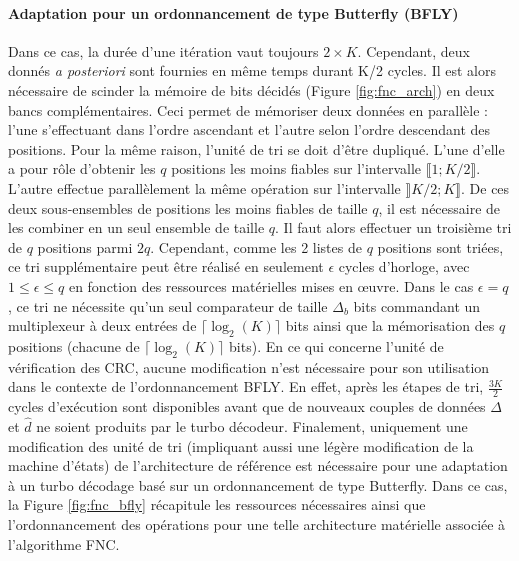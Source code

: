 \paragraph*{Adaptation pour un ordonnancement de type Butterfly (BFLY)}
Dans ce cas, la durée d'une itération vaut toujours $2\times K$. Cependant, deux donnés \textit{a posteriori} sont 
fournies en même temps durant K/2 cycles. Il est alors nécessaire de scinder la mémoire de bits décidés (Figure 
\ref{fig:fnc_arch}) en deux bancs complémentaires.
Ceci permet de mémoriser deux données en parallèle : l'une s'effectuant dans l'ordre ascendant 
et l'autre selon l'ordre descendant des positions. Pour la même raison, l'unité de tri se doit d'être dupliqué. L'une
d'elle a pour rôle d'obtenir les $q$ positions les moins fiables sur l'intervalle $\llbracket 1; K/2 \rrbracket$. L'autre
effectue parallèlement la même opération sur l'intervalle $\rrbracket K/2; K \rrbracket$. De ces deux sous-ensembles de positions
les moins fiables de taille $q$, il est nécessaire de les combiner en un seul ensemble de taille $q$. Il faut alors 
effectuer un troisième tri de $q$ positions parmi $2q$. Cependant, comme les 2 listes de $q$ positions sont triées, ce 
tri supplémentaire peut être réalisé en seulement $\epsilon$ cycles d'horloge, avec $1\leq \epsilon \leq q$ en fonction
des ressources matérielles mises en œuvre. Dans le cas $\epsilon = q$, ce tri ne nécessite qu'un seul comparateur 
de taille $\Delta_b$ bits commandant un multiplexeur à deux entrées de $\lceil\log_2(K)\rceil$ bits ainsi que la 
mémorisation des $q$ positions (chacune de $\lceil\log_2(K)\rceil$ bits). En ce qui concerne l'unité de vérification des CRC, aucune modification n'est nécessaire pour
son utilisation dans le contexte de l'ordonnancement BFLY. En effet, après les étapes de tri, $\frac{3K}{2}$ cycles 
d'exécution sont disponibles avant que de nouveaux couples de données $\Delta$ et $\hat{d}$ ne soient produits par le
turbo décodeur. Finalement, uniquement une modification des unité de tri (impliquant aussi une légère modification de 
la machine d'états) de l'architecture de référence est nécessaire pour une adaptation à un turbo décodage basé sur un 
ordonnancement de type Butterfly. Dans ce cas, la Figure \ref{fig:fnc_bfly} récapitule les ressources nécessaires ainsi 
que l'ordonnancement des opérations pour une telle architecture matérielle associée à l'algorithme FNC.

